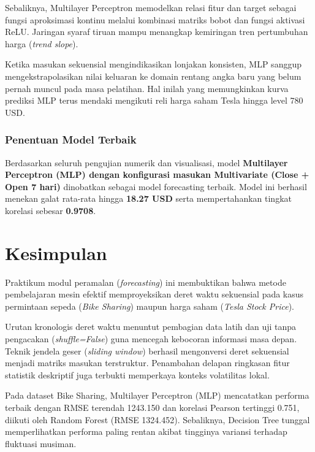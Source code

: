 \documentclass[a4paper,oneside,12pt]{report}
\begin{document}
Sebaliknya, Multilayer Perceptron memodelkan relasi fitur dan target sebagai fungsi aproksimasi kontinu melalui kombinasi matriks bobot dan fungsi aktivasi ReLU. Jaringan syaraf tiruan mampu menangkap kemiringan tren pertumbuhan harga (\textit{trend slope}).

Ketika masukan sekuensial mengindikasikan lonjakan konsisten, MLP sanggup mengekstrapolasikan nilai keluaran ke domain rentang angka baru yang belum pernah muncul pada masa pelatihan. Hal inilah yang memungkinkan kurva prediksi MLP terus mendaki mengikuti reli harga saham Tesla hingga level 780 USD.

\subsection{Penentuan Model Terbaik}
Berdasarkan seluruh pengujian numerik dan visualisasi, model \textbf{Multilayer Perceptron (MLP) dengan konfigurasi masukan Multivariate (Close + Open 7 hari)} dinobatkan sebagai model forecasting terbaik. Model ini berhasil menekan galat rata-rata hingga \textbf{18.27 USD} serta mempertahankan tingkat korelasi sebesar \textbf{0.9708}.

\clearpage

\chapter{Kesimpulan}

Praktikum modul peramalan (\textit{forecasting}) ini membuktikan bahwa metode pembelajaran mesin efektif memproyeksikan deret waktu sekuensial pada kasus permintaan sepeda (\textit{Bike Sharing}) maupun harga saham (\textit{Tesla Stock Price}). 

Urutan kronologis deret waktu menuntut pembagian data latih dan uji tanpa pengacakan (\textit{shuffle=False}) guna mencegah kebocoran informasi masa depan. Teknik jendela geser (\textit{sliding window}) berhasil mengonversi deret sekuensial menjadi matriks masukan terstruktur. Penambahan delapan ringkasan fitur statistik deskriptif juga terbukti memperkaya konteks volatilitas lokal.

Pada dataset Bike Sharing, Multilayer Perceptron (MLP) mencatatkan performa terbaik dengan RMSE terendah 1243.150 dan korelasi Pearson tertinggi 0.751, diikuti oleh Random Forest (RMSE 1324.452). Sebaliknya, Decision Tree tunggal memperlihatkan performa paling rentan akibat tingginya variansi terhadap fluktuasi musiman.
\end{document}
